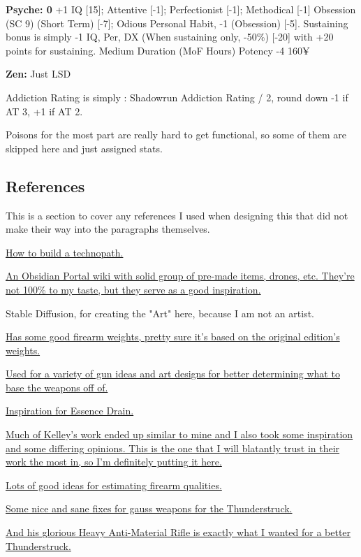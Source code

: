 \begin{multicols*}{2}
	\textbf{Psyche: 0}
	+1 IQ [15]; Attentive [-1]; Perfectionist [-1]; Methodical [-1] Obsession (SC 9) (Short Term) [-7]; Odious Personal Habit, -1 (Obsession) [-5]. Sustaining bonus is simply -1 IQ, Per, DX (When sustaining only, -50\%) [-20] with +20 points for sustaining.
	Medium Duration (MoF Hours)
	Potency	-4
	160¥
	
	\textbf{Zen: }
	Just LSD
	
	Addiction Rating is simply : Shadowrun Addiction Rating  / 2, round down -1 if AT 3, +1 if AT 2.
	
	
	Poisons for the most part are really hard to get functional, so some of them are skipped here and just assigned stats.
	
	\subsection{References}
	
	This is a section to cover any references I used when designing this that did not make their way into the paragraphs themselves.
	
	\href{https://www.ravensnpennies.com/gurps101-how-to-build-a-technopath/}{How to build a technopath.}
	
	\href{https://gurps-sr.obsidianportal.com}{An Obsidian Portal wiki with solid group of pre-made items, drones, etc. They're not 100\% to my taste, but they serve as a good inspiration.}
	
	Stable Diffusion, for creating the "Art" here, because I am not an artist.
	
	\href{http://www.ci-n.com/~jcampbel/rpgs/shadowrun/weapons.php?altskills}{Has some good firearm weights, pretty sure it's based on the original edition's weights.}
	
	\href{http://www.ambient.ca/cpunk/shadowguns/subguns.html}{Used for a variety of gun ideas and art designs for better determining what to base the weapons off of.}
	
	\href{http://forums.sjgames.com/showthread.php?t=152300}{Inspiration for Essence Drain.}
	
	\href{http://forums.sjgames.com/showpost.php?p=507199&postcount=8}{Much of Kelley's work ended up similar to mine and I also took some inspiration and some differing opinions. This is the one that I will blatantly trust in their work the most in, so I'm definitely putting it here.}
	
	\href{http://gurb3d6.blogspot.com/2017/01/ultra-tech-quickie-more-blaster-and.html}{Lots of good ideas for estimating firearm qualities.}
	
	\href{http://gurb3d6.blogspot.com/2017/05/gauss-weapons-reloaded.html}{Some nice and sane fixes for gauss weapons for the Thunderstruck.}
	
	\href{http://gurb3d6.blogspot.com/2016/09/have-gauss-will-travel.html}{And his glorious Heavy Anti-Material Rifle is exactly what I wanted for a better Thunderstruck.}
	
\end{multicols*}